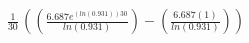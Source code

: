 \documentclass[preview]{standalone}
\begin{document}
\begin{align*}
\frac{1}{30}\,((\frac{6.687e^{(ln(0.931))30}}{ln(0.931)})-(\frac{6.687(1)}{ln(0.931)}))
\end{align*}
\end{document}
